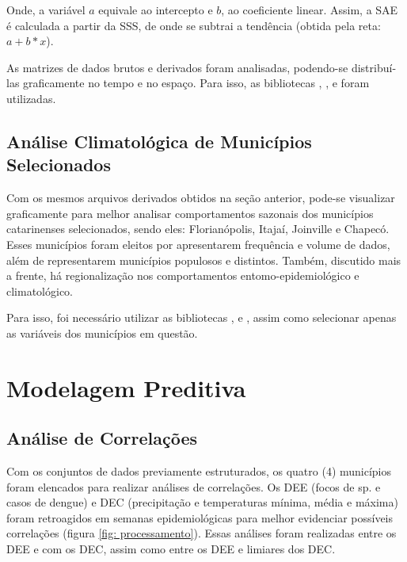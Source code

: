 Onde, a variável $a$ equivale ao intercepto e $b$, ao coeficiente linear. Assim, a \acrfull{SAE} é calculada a partir da \acrfull{SSS}, de onde se subtrai a tendência (obtida pela reta: $a + b * x$).


\indent As matrizes de dados brutos e derivados foram analisadas, podendo-se distribuí-las graficamente no tempo e no espaço. Para isso, as bibliotecas ,  \cite{seaborn_2021_waskom},  e  \cite{geopandas_2020_kelseyjordahl} foram utilizadas.

\subsection{Análise Climatológica de Municípios Selecionados}

\indent Com os mesmos arquivos derivados obtidos na seção anterior, pode-se visualizar graficamente para melhor analisar comportamentos sazonais dos municípios catarinenses selecionados, sendo eles: Florianópolis, Itajaí, Joinville e Chapecó. Esses municípios foram eleitos por apresentarem frequência e volume de dados, além de representarem municípios populosos e distintos. Também, discutido mais a frente, há regionalização nos comportamentos entomo-epidemiológico e climatológico.

\indent Para isso, foi necessário utilizar as bibliotecas ,  e , assim como selecionar apenas as variáveis dos municípios em questão.

\section{Modelagem Preditiva}

\subsection{Análise de Correlações}

\indent Com os conjuntos de dados previamente estruturados, os quatro (4) municípios foram elencados para realizar análises de correlações. Os \acrfull{DEE} (focos de  sp. e casos de dengue) e  \acrfull{DEC} (precipitação e temperaturas mínima, média e máxima) foram retroagidos em semanas epidemiológicas para melhor evidenciar possíveis correlações (figura \ref{fig: processamento}). Essas análises foram realizadas entre os \acrshort{DEE} e com os \acrshort{DEC}, assim como entre os \acrshort{DEE} e limiares dos \acrshort{DEC}. 

